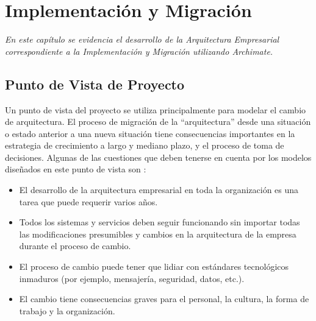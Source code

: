 \chapter{Implementación y Migración}
\label{chap:Implementacion}
\textit{En este capítulo se evidencia el desarrollo de la Arquitectura Empresarial correspondiente a la Implementación y Migración utilizando Archimate.}
\vspace{2ex}\vfill
\minitoc
\cleardoublepage

\section{Punto de Vista de Proyecto}
Un punto de vista del proyecto se utiliza principalmente para modelar el cambio de arquitectura. El proceso de migración de la “arquitectura” desde una situación o estado anterior a una nueva situación tiene consecuencias importantes en la estrategia de crecimiento a largo y mediano plazo, y el proceso de toma de decisiones. Algunas de las cuestiones que deben tenerse en cuenta por los modelos diseñados en este punto de vista son \cite{ref9}:
  
  \begin{itemize}
	\item El desarrollo de la arquitectura empresarial en toda la organización es una tarea que puede requerir varios años.
	\item Todos los sistemas y servicios deben seguir funcionando sin importar todas las modificaciones presumibles y cambios en la arquitectura de la empresa durante el proceso de cambio.
	\item El proceso de cambio puede tener que lidiar con estándares tecnológicos inmaduros (por ejemplo, mensajería, seguridad, datos, etc.).
	\item El cambio tiene consecuencias graves para el personal, la cultura, la forma de trabajo y la organización.
  \end{itemize}

